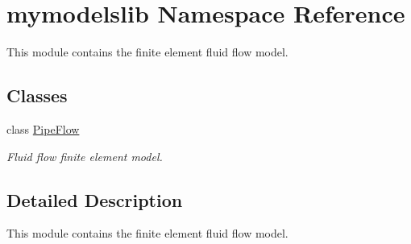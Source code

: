 \hypertarget{namespacemymodelslib}{}\section{mymodelslib Namespace Reference}
\label{namespacemymodelslib}


This module contains the finite element fluid flow model.  


\subsection*{Classes}
\begin{DoxyCompactItemize}
\item 
class \mbox{\hyperlink{classmymodelslib_1_1PipeFlow}{Pipe\+Flow}}
\begin{DoxyCompactList}\small\item\em Fluid flow finite element model. \end{DoxyCompactList}\end{DoxyCompactItemize}


\subsection{Detailed Description}
This module contains the finite element fluid flow model. 